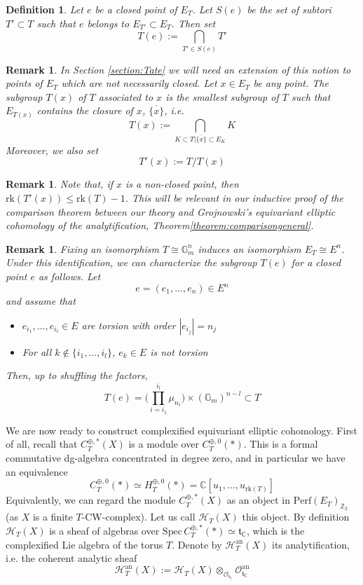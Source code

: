 \documentclass[11pt,letterpaper]{amsart}
\newtheorem{definition}[dummy]{Definition}
\newtheorem{remark}[dummy]{Remark}
\newcommand{\bC}{\mathbb{C}}
\newcommand{\bG}{\mathbb{G}}
\newcommand{\bZ}{\mathbb{Z}}
\newcommand{\cO}{\mathcal{O}}
\newcommand{\cH}{\mathcal{H}}
\newcommand{\ft}{\mathfrak{t}}
\newcommand{\Spec}{\mathrm{S}\mathrm{pec}\,}
\newcommand{\an}{\mathrm{an}}
\newcommand{\Perf}{\mathrm{Perf}}
\begin{document}
\begin{definition}\label{definition:T(x)}
Let $e$ be a closed point of $E_T$.  Let $S(e)$ be the set of subtori $T'\subset T$ such that $e$ belongs to $E_{T'}\subset E_T$. Then set 
$$T(e):=\bigcap_{T'\in S(e)}T'$$
\end{definition}
\begin{remark}\label{rmk:T(x)nonclosed}
In Section \ref{section:Tate} we will need an extension of this notion to  points of $E_T$ which are not necessarily closed. Let $x\in E_T$ be any point.
The subgroup $T(x)$ of $T$ associated to $x$ is the smallest subgroup of $T$ such that $E_{T(x)}$ contains the closure of $x$, $\overline{\{x\}}$, i.e. 
$$T(x):=\bigcap_{K\subset T|\overline{\{x\}}\subset E_K} K$$
Moreover, we also set 
$$T'(x):=T/T(x)$$
\end{remark}

\begin{remark}
Note that, if $x$ is a non-closed point, then $\mathrm{rk}(T'(x))\leq\mathrm{rk}(T)-1$. This will be relevant in our inductive proof of the comparison theorem between our theory and Grojnowski's equivariant elliptic cohomology of the analytification,  Theorem\ref{theorem:comparisongeneral}.
\end{remark}
\begin{remark}
Fixing an isomorphism $T\cong \bG_m^n$ induces an isomorphism $E_T \cong E^n$. Under this identification, we can characterize the subgroup $T(e)$ for a closed point $e$ as follows. Let $$e=(e_1,\dots, e_n) \in E^n$$ and assume that
\begin{itemize}
\item $e_{i_1}, \ldots, e_{i_l} \in E$ are torsion  with order $|e_{i_j}|=n_j$
\item For all $k \notin \{i_1, \ldots, i_l\}$, 
$e_k \in E$ is not torsion 
\end{itemize}
Then, up to shuffling the factors,  
$$
T(e) = \big ( \prod_{i=i_1}^{i_l}\mu_{n_i} \big ) \times (\bG_m)^{n-l} \subset T
$$ 
\end{remark}

We are now ready to construct complexified equivariant elliptic cohomology. First of all, recall that $C_T^{\oplus,\ast}(X)$ is a module over $C_T^{\oplus,0}(\ast)$. This is a formal commutative dg-algebra concentrated in degree zero, and in particular we have an equivalence  
$$C_T^{\oplus,0}(\ast)\simeq H_T^{\oplus,0}(\ast)=\bC[u_1, \dots, u_{\mathrm{rk}(T)}]$$ 
Equivalently, we can regard the module $C_T^{\oplus,\ast}(X)$ as an object in $\Perf(E_T)_{\bZ_2}$ (as $X$ is a finite $T$-CW-complex).
Let us call $\mathcal{H}_T(X)$ this object. By definition $\cH_T(X)$ is a sheaf of algebras over $\Spec C_T^{\oplus,\ast}(\ast)\simeq\ft_\bC$, which is the complexified Lie algebra of the torus $T$. Denote by  $\mathcal{H}_T^{\an}(X)$ its analytification, i.e. the coherent analytic sheaf 
$$\mathcal{H}_T^{\an}(X):=\mathcal{H}_T(X)\otimes_{\cO_{\ft_\bC}}\cO_{\ft_\bC}^\an$$ 
\end{document}
